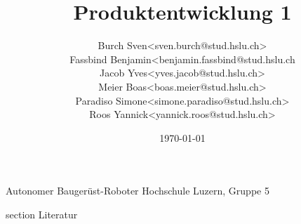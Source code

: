 \documentclass[oneside]{modern}
\title{Produktentwicklung 1}
\author{
\begin{tabular}{ l l }
  Burch Sven & <sven.burch@stud.hslu.ch> \\
  Fassbind Benjamin & <benjamin.fassbind@stud.hslu.ch \\
  Jacob Yves & <yves.jacob@stud.hslu.ch> \\
  Meier Boas & <boas.meier@stud.hslu.ch> \\
  Paradiso Simone & <simone.paradiso@stud.hslu.ch> \\
  Roos Yannick & <yannick.roos@stud.hslu.ch>
\end{tabular}
}
\date{\today}
\begin{document}
   \renewcommand{\thesection}{\arabic{section}}
   \makeatletter
   \g@addto@macro{\UrlBreaks}{\UrlOrds}
   \makeatother
   


  \nocite{*}

  \firstpage
    {Autonomer Baugerüst-Roboter}
    {Hochschule Luzern, Gruppe 5}
    {\theauthor}

  
  
  \newpage
  \addtableofcontents
  
  \newpage
  \listoffigures
  
  \newpage
  \listoftables

  \newpage
  
  

  
  
  
  
  
  
  
  
  
  

  \newpage
  \addglossary

  \newpage
    {section}
    {Literatur}

  \printbibliography[
    heading=subbibliography
  ]
  
\end{document}
